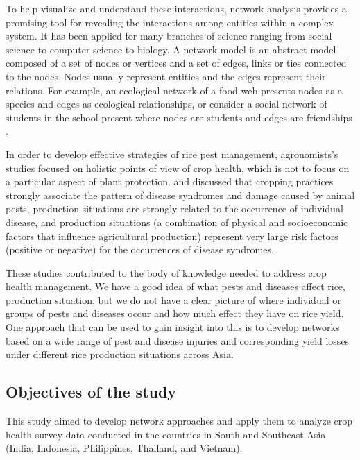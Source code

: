 To help visualize and understand these interactions, network analysis provides a promising tool for revealing the interactions among entities within a complex system. It has been applied for many branches of science ranging from social science to computer science to biology. A network model is an abstract model composed of a set of nodes or vertices and a set of edges, links or ties connected to the nodes. Nodes usually represent entities and the edges represent their relations. For example, an ecological network of a food web presents nodes as a species \citep{Krause_2003_Compartments} and edges as ecological relationships, or consider a social network of students in the school present where nodes are students and edges are friendships \citep{Moody_2001_Race}.

In order to develop effective strategies of rice pest management, agronomists's studies focused on holistic points of view of crop health, which is not to focus on a particular aspect of plant protection. \citet{Savary_1995_Use,Savary_2000_Quantification} and \citet{Savary_2005_Multiple} discussed that cropping practices strongly associate the pattern of disease syndromes and damage caused by animal pests, production situations are strongly related to the occurrence of individual disease, and production situations (a combination of physical and socioeconomic factors that influence agricultural production) represent very large risk factors (positive or negative) for the occurrences of disease syndromes. 

These studies contributed to the body of knowledge needed to address crop health management. We have a good idea of what pests and diseases affect rice, production situation, but we do not have a clear picture of where individual or groups of pests and diseases occur and how much effect they have on rice yield. One approach that can be used to gain insight into this is to develop networks based on a wide range of pest and disease injuries and corresponding yield losses under different rice production situations across Asia. 

\subsection{Objectives of the study}
This study aimed to develop network approaches and apply them to analyze crop health survey data conducted in the countries in South and Southeast Asia (India, Indonesia, Philippines, Thailand, and Vietnam). 

